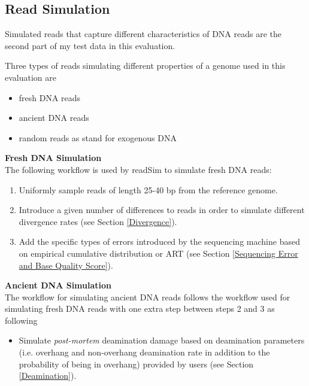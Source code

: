 \documentclass[11pt,a4paper]{report}
\begin{document}


\subsection{Read Simulation} \label{Read Simulation}

Simulated reads that capture different characteristics of DNA reads are the 
second part of my test data in this evaluation.

Three types of reads simulating different properties of a genome used in this
 evaluation are

\begin{itemize}
	\item fresh DNA reads
	\item ancient DNA reads
	\item random reads as stand for exogenous DNA
\end{itemize}

\textbf{Fresh DNA Simulation}\\

The following workflow is used by readSim to simulate fresh DNA
 reads:

\begin{enumerate}
 \item Uniformly sample reads of length 25-40 bp from the reference genome.

 \item Introduce a given number of differences to 
 reads in order to simulate different divergence rates
 (see Section \ref{Divergence}).

 \item Add the specific types of errors introduced by the sequencing 
 machine based on empirical cumulative distribution or ART\cite{art} 
 (see Section \ref{Sequencing Error and Base Quality Score}).
\end{enumerate}


\textbf{Ancient DNA Simulation} \\

The workflow for simulating ancient DNA reads follows the workflow used for 
simulating fresh DNA reads with one extra step between steps 2 and 3 as following

\begin{itemize}
 
\item Simulate \emph{post-mortem} deamination damage based on 
deamination parameters (i.e. overhang and non-overhang deamination 
rate in addition to the probability of being in overhang) provided by users
(see Section \ref{Deamination}). 

\end{itemize}
\end{document}
